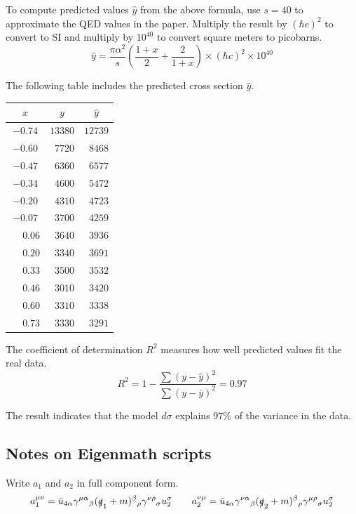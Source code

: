 \documentclass[12pt]{article}
\begin{document}
\noindent
To compute predicted values $\hat{y}$ from the above formula,
use $s=40$ to approximate the QED values in the paper.
Multiply the result by $(\hbar c)^2$ to convert to SI
and multiply by $10^{40}$ to convert square meters to picobarns.
\begin{equation*}
\hat{y}
=
\frac{\pi\alpha^2}{s}
\left(
\frac{1+x}{2}+
\frac{2}{1+x}
\right)
\times(\hbar c)^2
\times10^{40}
\end{equation*}

\noindent
The following table includes the predicted cross section $\hat{y}$.

\begin{center}
\begin{tabular}{|c|c|c|}
\hline
$x$ & $y$ & $\hat{y}$\\
\hline
$-0.74$ & $13380$ & $12739$\\
$-0.60$ & $\phantom{0}7720$ & $\phantom{0}8468$\\
$-0.47$ & $\phantom{0}6360$ & $\phantom{0}6577$\\
$-0.34$ & $\phantom{0}4600$ & $\phantom{0}5472$\\
$-0.20$ & $\phantom{0}4310$ & $\phantom{0}4723$\\
$-0.07$ & $\phantom{0}3700$ & $\phantom{0}4259$\\
$\phantom{+}0.06$ & $\phantom{0}3640$ & $\phantom{0}3936$\\
$\phantom{+}0.20$ & $\phantom{0}3340$ & $\phantom{0}3691$\\
$\phantom{+}0.33$ & $\phantom{0}3500$ & $\phantom{0}3532$\\
$\phantom{+}0.46$ & $\phantom{0}3010$ & $\phantom{0}3420$\\
$\phantom{+}0.60$ & $\phantom{0}3310$ & $\phantom{0}3338$\\
$\phantom{+}0.73$ & $\phantom{0}3330$ & $\phantom{0}3291$\\
\hline
\end{tabular}
\end{center}

\noindent
The coefficient of determination $R^2$ measures how well predicted values fit the real data.
\begin{equation*}
R^2=1-\frac{\sum(y-\hat{y})^2}{\sum(y-\bar{y})^2}=0.97
\end{equation*}

\noindent
The result indicates that the model $d\sigma$ explains 97\% of the variance in the data.

\subsection*{Notes on Eigenmath scripts}
Write $a_1$ and $a_2$ in full component form.
\begin{equation*}
a_1^{\mu\nu}
=\bar{u}_{4\alpha}\gamma^{\mu\alpha}{}_\beta(\slashed{q}_1+m)^\beta{}_\rho\gamma^{\nu\rho}{}_\sigma u_2^\sigma
\qquad
a_2^{\nu\mu}
=\bar{u}_{4\alpha}\gamma^{\nu\alpha}{}_\beta(\slashed{q}_2+m)^\beta{}_\rho\gamma^{\mu\rho}{}_\sigma u_2^\sigma
\end{equation*}
\end{document}
